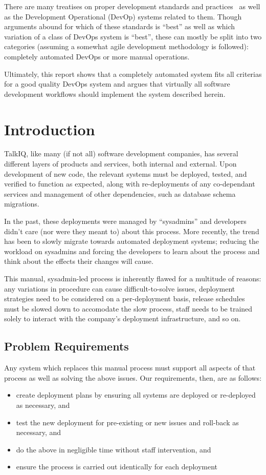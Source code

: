 \documentclass[12pt]{article}
\begin{document}
There are many treatises on proper development standards and practices~\cite{practices} as well as the Development Operational (DevOp) systems related to them. Though arguments abound for which of these standards is ``best'' as well as which variation of a class of DevOps system is ``best'', these can mostly be split into two categories (assuming a somewhat agile development methodology is followed): completely automated DevOps or more manual operations.

Ultimately, this report shows that a completely automated system fits all criterias for a good quality DevOps system and argues that virtually all software development workflows should implement the system described herein.
\newpage


\toc
\lot


\section{Introduction}
TalkIQ, like many (if not all) software development companies, has several different layers of products and services, both internal and external. Upon development of new code, the relevant systems must be deployed, tested, and verified to function as expected, along with re-deployments of any co-dependant services and management of other dependencies, such as database schema migrations.

In the past, these deployments were managed by ``sysadmins'' and developers didn't care (nor were they meant to) about this process. More recently, the trend has been to slowly migrate towards automated deployment systems; reducing the workload on sysadmins and forcing the developers to learn about the process and think about the effects their changes will cause.

This manual, sysadmin-led process is inherently flawed for a multitude of reasons: any variations in procedure can cause difficult-to-solve issues, deployment strategies need to be considered on a per-deployment basis, release schedules must be slowed down to accomodate the slow process, staff needs to be trained solely to interact with the company's deployment infrastructure, and so on.

\subsection{Problem Requirements}
Any system which replaces this manual process must support all aspects of that process as well as solving the above issues. Our requirements, then, are as follows:
\begin{itemize}
\item create deployment plans by ensuring all systems are deployed or re-deployed as necessary, and
\item test the new deployment for pre-existing or new issues and roll-back as necessary, and
\item do the above in negligible time without staff intervention, and
\item ensure the process is carried out identically for each deployment
\end{itemize}
\end{document}
